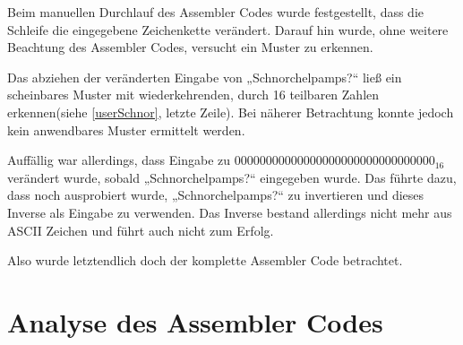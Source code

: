 \documentclass{scrartcl}
\begin{document}
Beim manuellen Durchlauf des Assembler Codes wurde festgestellt, dass die Schleife die eingegebene Zeichenkette verändert. Darauf hin wurde, ohne weitere Beachtung des Assembler Codes, versucht ein Muster zu erkennen.

\begin{table}[!ht]%
\centering%
%
\caption{Nutzereingabe, „Schnorchelpamps?“ und mögliches Muster.}
\label{userSchnor}
\end{table}

Das abziehen der veränderten Eingabe von „Schnorchelpamps?“ ließ ein scheinbares Muster mit wiederkehrenden, durch 16 teilbaren Zahlen erkennen(siehe \autoref{userSchnor}, letzte Zeile). Bei näherer Betrachtung konnte jedoch kein anwendbares Muster ermittelt werden.

Auffällig war allerdings, dass Eingabe zu 00000000000000000000000000000000$_{16}$ verändert wurde, sobald „Schnorchelpamps?“ eingegeben wurde. Das führte dazu, dass noch ausprobiert wurde, „Schnorchelpamps?“ zu invertieren und dieses Inverse als Eingabe zu verwenden. Das Inverse bestand allerdings nicht mehr aus ASCII Zeichen und führt auch nicht zum Erfolg.

Also wurde letztendlich doch der komplette Assembler Code betrachtet.

\section{Analyse des Assembler Codes}
\end{document}
